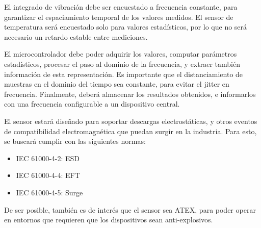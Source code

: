 \documentclass[11pt]{charter}
\begin{document}
El integrado de vibración debe ser encuestado a frecuencia constante, para garantizar el espaciamiento temporal de los valores medidos. El sensor de temperatura será encuestado solo para valores estadísticos, por lo que no será necesario un retardo estable entre mediciones.

El microcontrolador debe poder adquirir los valores, computar parámetros estadísticos, procesar el paso al dominio de la frecuencia, y extraer también información de esta representación. Es importante que el distanciamiento de muestras en el dominio del tiempo sea constante, para evitar el jitter en frecuencia. Finalmente, deberá almacenar los resultados obtenidos, e informarlos con una frecuencia configurable a un dispositivo central.

El sensor estará diseñado para soportar descargas electrostáticas, y otros eventos de compatibilidad electromagnética que puedan surgir en la industria. Para esto, se buscará cumplir con las siguientes normas:
\begin{itemize}
\item IEC 61000-4-2: ESD
\item IEC 61000-4-4: EFT
\item IEC 61000-4-5: Surge
\end{itemize}

De ser posible, también es de interés que el sensor sea ATEX, para poder operar en entornos que requieren que los dispositivos sean anti-explosivos.
\end{document}
